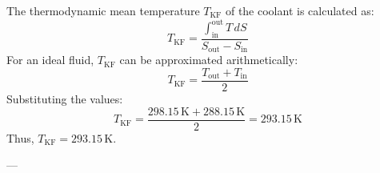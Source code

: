 The thermodynamic mean temperature \( T_{\text{KF}} \) of the coolant is calculated as:  
\[
T_{\text{KF}} = \frac{\int_{\text{in}}^{\text{out}} T \, dS}{S_{\text{out}} - S_{\text{in}}}
\]  
For an ideal fluid, \( T_{\text{KF}} \) can be approximated arithmetically:  
\[
T_{\text{KF}} = \frac{T_{\text{out}} + T_{\text{in}}}{2}
\]  
Substituting the values:  
\[
T_{\text{KF}} = \frac{298.15 \, \text{K} + 288.15 \, \text{K}}{2} = 293.15 \, \text{K}
\]  
Thus, \( T_{\text{KF}} = 293.15 \, \text{K} \).  

---